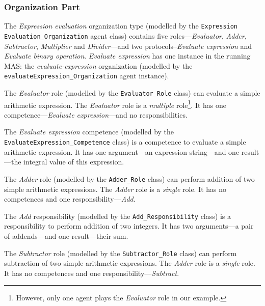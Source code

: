 \subsubsection*{Organization Part}

The \textit{Expression evaluation} organization type (modelled by the \texttt{Expression Evaluation\_Organization} agent class) contains five roles---\textit{Evaluator}, \textit{Adder}, \textit{Subtractor}, \textit{Multiplier} and \textit{Divider}---and two protocols--\textit{Evaluate expression} and \textit{Evaluate binary operation}.
\textit{Evaluate expression} has one instance in the running MAS: the \textit{evaluate-expression} organization (modelled by the \texttt{evaluateExpression\_Organization} agent instance).

The \textit{Evaluator} role (modelled by the \texttt{Evaluator\_Role} class) can evaluate a simple arithmetic expression.
The \textit{Evaluator} role is a \textit{multiple} role\footnote{However, only one agent plays the \textit{Evaluator} role in our example.}.
It has one competence---\textit{Evaluate expression}---and no responsibilities.

The \textit{Evaluate expression} competence (modelled by the \texttt{EvaluateExpression\_Competence} class) is a competence to evaluate a simple arithmetic expression.
It has one argument---an expression string---and one result---the integral value of this expression. 

The \textit{Adder} role (modelled by the \texttt{Adder\_Role} class) can perform addition of two simple arithmetic expressions.
The \textit{Adder} role is a \textit{single} role.
It has no competences and one responsibility---\textit{Add}.

The \textit{Add} responsibility (modelled by the \texttt{Add\_Responsibility} class) is a responsibility to perform addition of two integers.
It has two arguments---a pair of addends---and one result---their sum.

The \textit{Subtractor} role (modelled by the \texttt{Subtractor\_Role} class) can perform subtraction of two simple arithmetic expressions.
The \textit{Adder} role is a \textit{single} role.
It has no competences and one responsibility---\textit{Subtract}.

